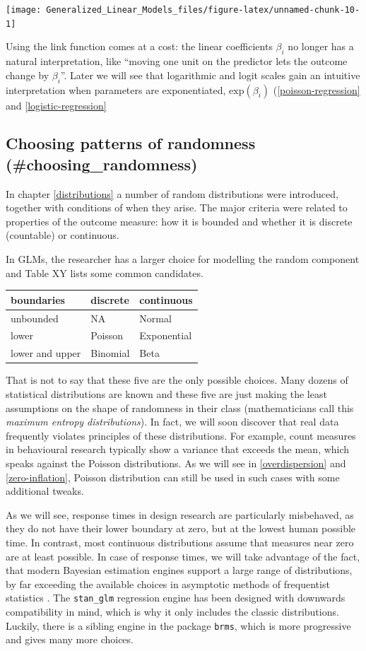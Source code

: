 \documentclass[]{svmono}
\begin{document}
\texttt{[image: Generalized\_Linear\_Models\_files/figure-latex/unnamed-chunk-10-1]}

Using the link function comes at a cost: the linear coefficients
\(\beta_i\) no longer has a natural interpretation, like ``moving one
unit on the predictor lets the outcome change by \(\beta_i\)''. Later we
will see that logarithmic and logit scales gain an intuitive
interpretation when parameters are exponentiated,
\(\textrm{exp}(\beta_i)\) (\ref{poisson-regression} and
\ref{logistic-regression}

\subsection{Choosing patterns of randomness
(\#choosing\_randomness)}\label{choosing-patterns-of-randomness-choosing_randomness}

In chapter \ref{distributions} a number of random distributions were
introduced, together with conditions of when they arise. The major
criteria were related to properties of the outcome measure: how it is
bounded and whether it is discrete (countable) or continuous.

In GLMs, the researcher has a larger choice for modelling the random
component and Table XY lists some common candidates.

\begin{tabular}{l|l|l}
\hline
boundaries & discrete & continuous\\
\hline
unbounded & NA & Normal\\
\hline
lower & Poisson & Exponential\\
\hline
lower and upper & Binomial & Beta\\
\hline
\end{tabular}

That is not to say that these five are the only possible choices. Many
dozens of statistical distributions are known and these five are just
making the least assumptions on the shape of randomness in their class
(mathematicians call this \emph{maximum entropy distributions}). In
fact, we will soon discover that real data frequently violates
principles of these distributions. For example, count measures in
behavioural research typically show a variance that exceeds the mean,
which speaks against the Poisson distributions. As we will see in
\ref{overdispersion} and \ref{zero-inflation}, Poisson distribution can
still be used in such cases with some additional tweaks.

As we will see, response times in design research are particularly
misbehaved, as they do not have their lower boundary at zero, but at the
lowest human possible time. In contrast, most continuous distributions
assume that measures near zero are at least possible. In case of
response times, we will take advantage of the fact, that modern Bayesian
estimation engines support a large range of distributions, by far
exceeding the available choices in asymptotic methods of frequentist
statistics . The \texttt{stan\_glm} regression engine has been designed
with downwards compatibility in mind, which is why it only includes the
classic distributions. Luckily, there is a sibling engine in the package
\texttt{brms}, which is more progressive and gives many more choices.
\end{document}
